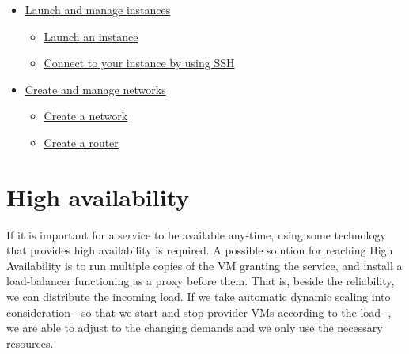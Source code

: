 \documentclass[a4paper]{article}
\begin{document}
\begin{itemize}
\begin{itemize}
{                        a key pair}
              \item
                    \href{https://docs.openstack.org/horizon/pike/user/configure-access-and-security-for-instances.html#import-a-key-pair}{
                        Import a key pair}
              \item
                    \href{https://docs.openstack.org/horizon/pike/user/configure-access-and-security-for-instances.html#allocate-a-floating-ip-address-to-an-instance}{Allocate a floating IP address to an instance}
          \end{itemize}
    \item \href{https://docs.openstack.org/horizon/pike/user/launch-instances.html}{Launch and manage instances}
          \begin{itemize}
              \item \href{https://docs.openstack.org/horizon/pike/user/launch-instances.html#launch-an-instance}{Launch an instance}
              \item
                    \href{https://docs.openstack.org/horizon/pike/user/launch-instances.html#connect-to-your-instance-by-using-ssh}{Connect
                        to your instance by using SSH}
          \end{itemize}
    \item \href{https://docs.openstack.org/horizon/pike/user/create-networks.html}{Create and manage networks}
          \begin{itemize}
              \item \href{https://docs.openstack.org/horizon/pike/user/create-networks.html#create-a-network}{Create a network}
              \item \href{https://docs.openstack.org/horizon/pike/user/create-networks.html#create-a-router}{Create a router}
          \end{itemize}
\end{itemize}

\section{High availability}

If it is important for a service to be available any-time, using some technology that provides high availability is
required. A possible solution for reaching High Availability is to run multiple copies of the VM granting
the service, and install a load-balancer functioning as a proxy before them. That is, beside the reliability, we can
distribute the incoming load. If we take automatic dynamic scaling into consideration - so that we start and stop
provider VMs according to the load -, we are able to adjust to the changing demands and we only use the
necessary resources.
\end{document}
